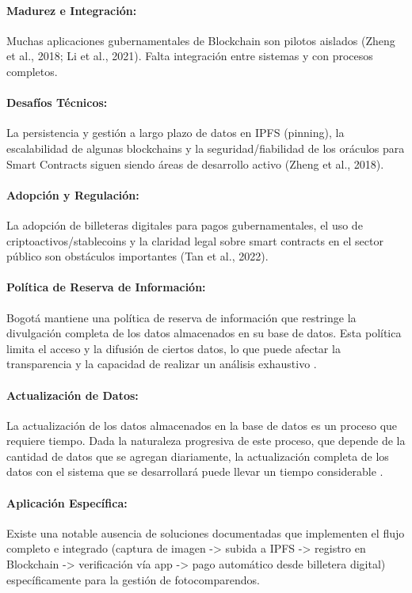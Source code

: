 \paragraph{Madurez e Integración:}
Muchas aplicaciones gubernamentales de Blockchain son pilotos aislados (Zheng et al., 2018; Li et al., 2021). Falta integración entre sistemas y con procesos completos. 

\paragraph{Desafíos Técnicos: }
La persistencia y gestión a largo plazo de datos en IPFS (pinning), la escalabilidad de algunas blockchains y la seguridad/fiabilidad de los oráculos para Smart Contracts siguen siendo áreas de desarrollo activo (Zheng et al., 2018). 

\paragraph{Adopción y Regulación:}
La adopción de billeteras digitales para pagos gubernamentales, el uso de criptoactivos/stablecoins y la claridad legal sobre smart contracts en el sector público son obstáculos importantes (Tan et al., 2022).

\paragraph{Política de Reserva de Información:}
 Bogotá mantiene una política de reserva de información que restringe la divulgación completa de los datos almacenados en su base de datos. Esta política limita el acceso y la difusión de ciertos datos, lo que puede afectar la transparencia y la capacidad de realizar un análisis exhaustivo \parencite{choquevilca2024blockchain}.

\paragraph{Actualización de Datos:}
La actualización de los datos almacenados en la base de datos es un proceso que requiere tiempo. Dada la naturaleza progresiva de este proceso, que depende de la cantidad de datos que se agregan diariamente, la actualización completa de los datos con el sistema que se desarrollará puede llevar un tiempo considerable \parencite{choquevilca2024blockchain}. 

\paragraph{Aplicación Específica:}
Existe una notable ausencia de soluciones documentadas que implementen el flujo completo e integrado (captura de imagen -> subida a IPFS -> registro en Blockchain -> verificación vía app -> pago automático desde billetera digital) específicamente para la gestión de fotocomparendos. \parencite{yousfi2022its, chen2024blockchain}


